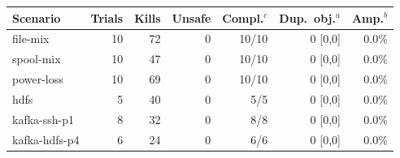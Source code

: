 
\begin{tabular}{@{}lrrrrrr@{}}
\toprule
Scenario & Trials & Kills & Unsafe & Compl.$^c$ & Dup.\ obj.$^a$ & Amp.$^b$ \\
\midrule
file-mix & 10 & 72 & 0 & 10/10 & 0 [0,0] & 0.0\% \\
spool-mix & 10 & 47 & 0 & 10/10 & 0 [0,0] & 0.0\% \\
power-loss & 10 & 69 & 0 & 10/10 & 0 [0,0] & 0.0\% \\
hdfs & 5 & 40 & 0 & 5/5 & 0 [0,0] & 0.0\% \\
kafka-ssh-p1 & 8 & 32 & 0 & 8/8 & 0 [0,0] & 0.0\% \\
kafka-hdfs-p4 & 6 & 24 & 0 & 6/6 & 0 [0,0] & 0.0\% \\
\bottomrule
\end{tabular}
